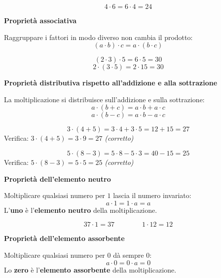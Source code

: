 \begin{esempio}
  \[
    4 \cdot 6 = 6 \cdot 4 = 24
  \]
\end{esempio}

\begin{regola}
  \textbf{Proprietà associativa}

  Raggruppare i fattori in modo diverso non cambia il prodotto:
  \[
    (a \cdot b) \cdot c = a \cdot (b \cdot c)
  \]
\end{regola}

\begin{esempio}
  \[
    (2 \cdot 3) \cdot 5 = 6 \cdot 5 = 30
  \]
  \[
    2 \cdot (3 \cdot 5) = 2 \cdot 15 = 30
  \]
\end{esempio}

\begin{regola}
  \textbf{Proprietà distributiva rispetto all'addizione e alla sottrazione}

  La moltiplicazione si distribuisce sull'addizione e sulla sottrazione:
  \[
    a \cdot (b + c) = a \cdot b + a \cdot c
  \]
  \[
    a \cdot (b - c) = a \cdot b - a \cdot c
  \]
\end{regola}

\begin{esempio}
  \[
    3 \cdot (4 + 5) = 3 \cdot 4 + 3 \cdot 5 = 12 + 15 = 27
  \]
  Verifica: \quad $3 \cdot (4 + 5) = 3 \cdot 9 = 27$ \quad \textit{(corretto)}

  \medskip
  \[
    5 \cdot (8 - 3) = 5 \cdot 8 - 5 \cdot 3 = 40 - 15 = 25
  \]
  Verifica: \quad $5 \cdot (8 - 3) = 5 \cdot 5 = 25$ \quad \textit{(corretto)}
\end{esempio}

\begin{regola}
  \textbf{Proprietà dell'elemento neutro}

  Moltiplicare qualsiasi numero per $1$ lascia il numero invariato:
  \[
    a \cdot 1 = 1 \cdot a = a
  \]
  L'\textbf{uno} è l'\textbf{elemento neutro} della moltiplicazione.
\end{regola}

\begin{esempio}
  \[
    37 \cdot 1 = 37 \qquad \qquad 1 \cdot 12 = 12
  \]
\end{esempio}

\begin{regola}
  \textbf{Proprietà dell'elemento assorbente}

  Moltiplicare qualsiasi numero per $0$ dà sempre $0$:
  \[
    a \cdot 0 = 0 \cdot a = 0
  \]
  Lo \textbf{zero} è l'\textbf{elemento assorbente} della moltiplicazione.
\end{regola}

